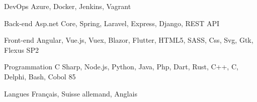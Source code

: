 

\begin{cvskills}

  \cvskill
    {DevOps} %
    {Azure, Docker, Jenkins, Vagrant} %

  \cvskill
    {Back-end} %
    {Asp.net Core, Spring, Laravel, Express, Django, REST API} %

  \cvskill
    {Front-end} %
    {Angular, Vue.js, Vuex, Blazor, Flutter, HTML5, SASS, Css, Svg, Gtk, Flexus SP2} %

  \cvskill
    {Programmation} %
    {C Sharp, Node.js, Python, Java, Php, Dart, Rust, C++, C, Delphi, Bash, Cobol 85} %

  \cvskill
    {Langues} %
    {Français, Suisse allemand, Anglais} %

\end{cvskills}
